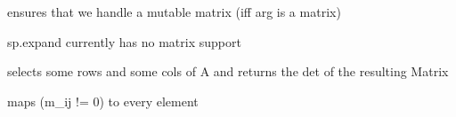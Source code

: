 \documentclass[letterpaper,10pt,english]{sphinxmanual}
\begin{document}
\begin{fulllineitems}
\label{pycontroltools:auxfuncs.math.matrix.ensure_mutable}
ensures that we handle a mutable matrix (iff arg is a matrix)

\end{fulllineitems}


\begin{fulllineitems}
\label{pycontroltools:auxfuncs.math.matrix.expand}
sp.expand currently has no matrix support

\end{fulllineitems}


\begin{fulllineitems}
\label{pycontroltools:auxfuncs.math.matrix.general_minor}
selects some rows and some cols of A and returns the det of the resulting
Matrix

\end{fulllineitems}


\begin{fulllineitems}
\label{pycontroltools:auxfuncs.math.matrix.getOccupation}
maps (m\_ij != 0) to every element

\end{fulllineitems}

\end{document}
